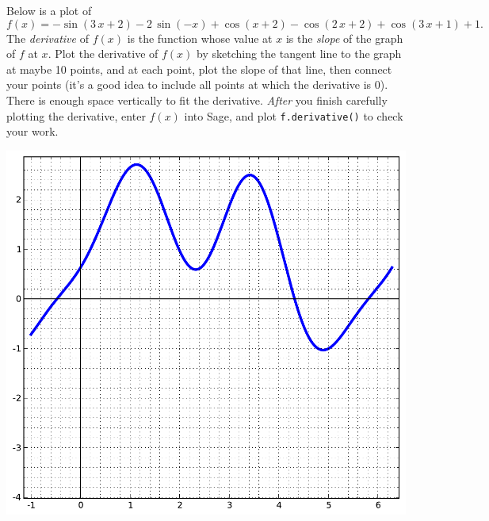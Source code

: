 Below is a plot of $$f(x)=-\sin\left(3 \, x + 2\right) - 2 \, \sin\left(-x\right) + \cos\left(x + 2\right) - \cos\left(2 \, x + 2\right) + \cos\left(3 \, x + 1\right) + 1.$$  The {\em \color{red}derivative} of $f(x)$ is the function whose value at $x$ is the {\em slope} of the graph of $f$ at $x$.  Plot the derivative of $f(x)$ by sketching the tangent line to the graph at maybe 10 points, and at each point, plot the slope of that line, then connect your points (it's a good idea to include all points at which the derivative is 0).  There is enough space vertically to fit the derivative.  {\em After} you finish carefully plotting the derivative, enter $f(x)$ into Sage, and plot {\color{blue}\verb|f.derivative()|} to check your work.
\begin{center}\includegraphics{functions/45.pdf}\end{center}\newpage

